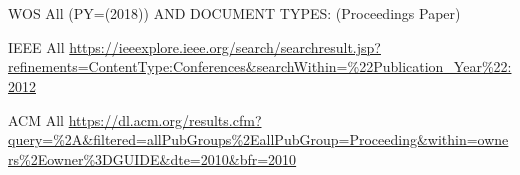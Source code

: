 \renewcommand{\appendixname}{Anhang}
\renewcommand{\appendixtocname}{Anhang}
\renewcommand{\appendixpagename}{Anhang}

\begin{appendices}
	\section{}\label{sec:sci_raw_dist}
	
	\section{}
	
	\section{}
	
	\section{}
	
	\section{}
	
	\section{}
	
	\section{}
	WOS All
	(PY=(2018)) AND DOCUMENT TYPES: (Proceedings Paper)
	
	IEEE All
	\url{https://ieeexplore.ieee.org/search/searchresult.jsp?refinements=ContentType:Conferences&searchWithin=%22Publication_Year%22:2012}
		
		ACM All
		\url{https://dl.acm.org/results.cfm?query=%2A&filtered=allPubGroups%2EallPubGroup=Proceeding&within=owners%2Eowner%3DGUIDE&dte=2010&bfr=2010}
\end{appendices}